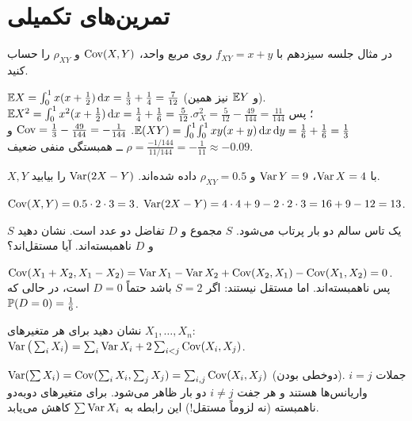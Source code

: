 \section{تمرین‌های تکمیلی}

\begin{exercise}
در مثال جلسه سیزدهم با $f_{XY}=x+y$ روی مربع واحد، $\operatorname{Cov}(X,Y)$ و $\rho_{XY}$ را حساب کنید.
\end{exercise}
\begin{solution}
$\mathbb{E} X=\int_0^1x(x+\frac12)\,\mathrm{d} x=\frac13+\frac14=\frac7{12}$ (و $\mathbb{E} Y$ نیز همین). $\mathbb{E} X^2=\int_0^1x^2(x+\frac12)\,\mathrm{d} x=\frac14+\frac16=\frac5{12}$؛ پس $\sigma_X^2=\frac5{12}-\frac{49}{144}=\frac{11}{144}$.
$\mathbb{E}(XY)=\int_0^1\!\int_0^1xy(x+y)\,\mathrm{d} x\,\mathrm{d} y=\frac16+\frac16=\frac13$.
$\operatorname{Cov}=\frac13-\frac{49}{144}=-\frac1{144}$ و $\rho=\frac{-1/144}{11/144}=-\frac1{11}\approx-0.09$ ــ همبستگی منفی ضعیف.
\end{solution}

\begin{exercise}
$X,Y$ با $\operatorname{Var} X=4$، $\operatorname{Var} Y=9$ و $\rho_{XY}=0.5$ داده شده‌اند. $\operatorname{Var}(2X-Y)$ را بیابید.
\end{exercise}
\begin{solution}
$\operatorname{Cov}(X,Y)=0.5\cdot2\cdot3=3$. $\operatorname{Var}(2X-Y)=4\cdot4+9-2\cdot2\cdot3=16+9-12=13$.
\end{solution}

\begin{exercise}
یک تاس سالم دو بار پرتاب می‌شود. $S$ مجموع و $D$ تفاضل دو عدد است. نشان دهید $S$ و $D$ ناهمبسته‌اند. آیا مستقل‌اند؟
\end{exercise}
\begin{solution}
$\operatorname{Cov}(X_1+X_2,X_1-X_2)=\operatorname{Var} X_1-\operatorname{Var} X_2+\operatorname{Cov}(X_2,X_1)-\operatorname{Cov}(X_1,X_2)=0$. پس ناهمبسته‌اند. اما مستقل نیستند: اگر $S=2$ باشد حتماً $D=0$ است، در حالی که $\mathbb{P}(D=0)=\frac16$.
\end{solution}

\begin{exercise}
نشان دهید برای هر متغیرهای $X_1,\ldots,X_n$:
$\operatorname{Var}\big(\sum_iX_i\big)=\sum_i\operatorname{Var} X_i+2\sum_{i<j}\operatorname{Cov}(X_i,X_j)$.
\end{exercise}
\begin{solution}
$\operatorname{Var}(\sum X_i)=\operatorname{Cov}(\sum_iX_i,\sum_jX_j)=\sum_{i,j}\operatorname{Cov}(X_i,X_j)$ (دوخطی بودن). جملات $i=j$ واریانس‌ها هستند و هر جفت $i\ne j$ دو بار ظاهر می‌شود. برای متغیرهای دوبه‌دو ناهمبسته (نه لزوماً مستقل!) این رابطه به $\sum\operatorname{Var} X_i$ کاهش می‌یابد.
\end{solution}
